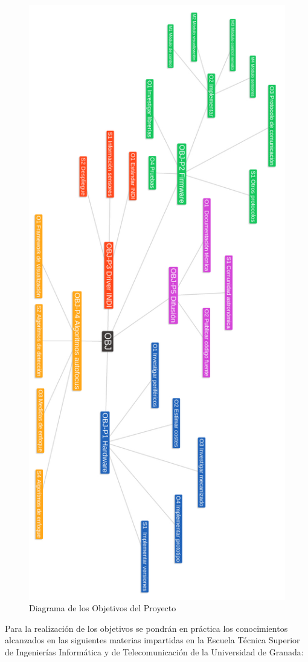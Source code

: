 \begin{figure}
\centering
\includegraphics[width=0.7\linewidth]{../images/diagrama_objetivos}
\caption[Diagrama de los Objetivos del Proyecto]{Diagrama de los Objetivos del Proyecto}
\label{fig:objetivos}
\end{figure}


Para la realización de los objetivos se pondrán en práctica los conocimientos alcanzados en las siguientes materias impartidas en la Escuela Técnica Superior de Ingenierías Informática y de Telecomunicación de la Universidad de Granada:

